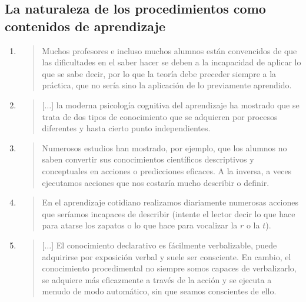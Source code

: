 \documentclass{article}
\begin{document}
\tableofcontents  \vspace{2cm}

\subsection*{La naturaleza de los procedimientos como contenidos de aprendizaje	}

\begin{enumerate}
  \item \begin{quote}
 Muchos profesores e incluso muchos alumnos están convencidos de que las dificultades en el saber hacer se deben a la incapacidad de aplicar lo que se sabe decir, por lo que la teoría debe preceder siempre a la práctica, que no sería sino la aplicación de lo previamente aprendido.
  \end{quote}

  \item \begin{quote}
  [$\ldots$] la moderna psicología cognitiva del aprendizaje ha mostrado que se trata de dos tipos de conocimiento que se adquieren por procesos diferentes y hasta cierto punto independientes.
  \end{quote}

  \item \begin{quote}
 Numerosos 	estudios han mostrado, por ejemplo, que los alumnos no saben convertir sus conocimientos científicos descriptivos y conceptuales en acciones o predicciones eficaces. A la inversa, a veces ejecutamos acciones que nos costaría mucho describir o definir. 
  \end{quote}

  \item \begin{quote}
  En el aprendizaje cotidiano realizamos diariamente numerosas acciones que seríamos incapaces de describir (intente el lector decir lo que hace para atarse los zapatos o lo que hace para vocalizar la $r$ o la $t$).
  \end{quote}

  \item \begin{quote}
 [$\ldots$] El conocimiento declarativo es fácilmente verbalizable, puede adquirirse por exposición verbal y suele ser consciente. En cambio, el conocimiento procedimental no siempre somos capaces de verbalizarlo, se adquiere más eficazmente a través de la acción y se ejecuta a menudo de modo automático, sin que seamos conscientes de ello.
  \end{quote}


\end{enumerate}
\end{document}
